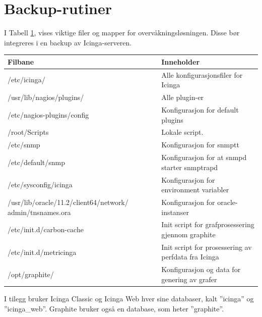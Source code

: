 \section{Backup-rutiner}
I Tabell \ref{backup}, vises viktige filer og mapper for overvåkningsløsningen. Disse bør integreres i en backup av Icinga-serveren.
\begin{table} \label{backup}
\begin{center}
\begin{tabular}{| p{8cm} | p{8cm} |}
 \hline
        \textbf{Filbane} & \textbf{Inneholder}
	\\ \hline
	/etc/icinga/						& Alle konfigurasjonsfiler for Icinga \\ \hline
	/usr/lib/nagios/plugins/				& Alle plugin-er \\ \hline
	/etc/nagios-plugins/config				& Konfigurasjon for default plugins \\ \hline
	/root/Scripts						& Lokale script. \\ \hline
	/etc/snmp 						& Konfigurasjon for snmptt \\ \hline
	/etc/default/snmp 					& Konfigurasjon for at snmpd starter snmptrapd \\ \hline
	/etc/sysconfig/icinga					& Konfigurasjon for environment variabler \\ \hline
	/usr/lib/oracle/11.2/client64/network/
	admin/tnsnames.ora					& Konfigurasjon for oracle-instanser \\ \hline
	/etc/init.d/carbon-cache				& Init script for grafprosessering gjennom graphite \\ \hline
	/etc/init.d/metricinga					& Init script for prosessering av perfdata fra Icinga \\ \hline
	/opt/graphite/						& Konfigurasjon og data for genering av grafer  \\ \hline
\end{tabular}
\end{center}
\end{table}
I tilegg bruker Icinga Classic og Icinga Web hver sine databaser, kalt ''icinga'' og ''icinga\_web''. Graphite bruker også en database, som heter ''graphite''.
